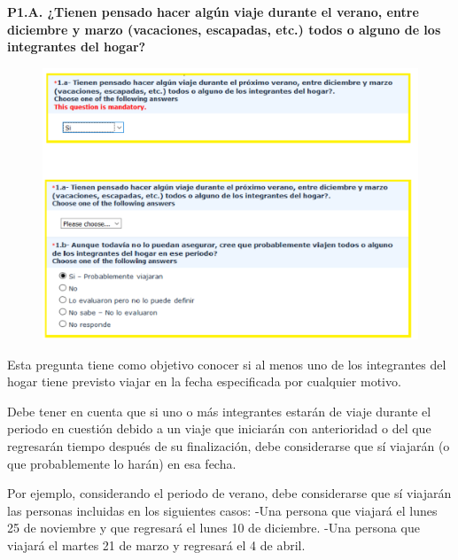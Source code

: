 \documentclass[
  openany]{book}
\begin{document}
\textbf{P1.A. ¿Tienen pensado hacer algún viaje durante el verano, entre diciembre y marzo (vacaciones, escapadas, etc.) todos o alguno de los integrantes del hogar?}

\begin{figure}

{\centering \includegraphics[width=1\linewidth]{imagenes/figura6-138} 

}

\end{figure}

Esta pregunta tiene como objetivo conocer si al menos uno de los integrantes del hogar tiene previsto viajar en la fecha especificada por cualquier motivo.

Debe tener en cuenta que si uno o más integrantes estarán de viaje durante el periodo en cuestión debido a un viaje que iniciarán con anterioridad o del que regresarán tiempo después de su finalización, debe considerarse que sí viajarán (o que probablemente lo harán) en esa fecha.

Por ejemplo, considerando el periodo de verano, debe considerarse que sí viajarán las personas incluidas en los siguientes casos: -Una persona que viajará el lunes 25 de noviembre y que regresará el lunes 10 de diciembre. -Una persona que viajará el martes 21 de marzo y regresará el 4 de abril.
\end{document}
